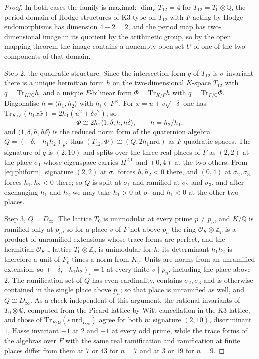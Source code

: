 \documentclass[11pt,reqno]{amsart}
\numberwithin{equation}{section}
\theoremstyle{plain}
\theoremstyle{definition}
\newcommand{\QQ}{\mathbb{Q}}
\newcommand{\ZZ}{\mathbb{Z}}
\begin{document}
\begin{proof}
In both cases the family is maximal: $\dim_{F}T_{12}=4$ for $T_{12}=T_{0}\otimes\QQ$, the period domain of Hodge structures of K3 type on $T_{12}$ with $F$ acting by Hodge endomorphisms has dimension $4-2=2$, and the period map has two-dimensional image in its quotient by the arithmetic group, so by the open mapping theorem the image contains a nonempty open set $U$ of one of the two components of that domain.

Step 2, the quadratic structure. Since the intersection form $q$ of $T_{12}$ is $\sigma$-invariant there is a unique hermitian form $h$ on the two-dimensional $K$-space $T_{12}$ with $q=\mathrm{Tr}_{K/\QQ}h$, and a unique $F$-bilinear form $\Phi=\mathrm{Tr}_{K/F}h$ with $q=\mathrm{Tr}_{F/\QQ}\Phi$. Diagonalise $h=\langle h_{1},h_{2}\rangle$ with $h_{i}\in F^{\times}$. For $x=u+v\sqrt{-\delta}$ one has $\mathrm{Tr}_{K/F}(h_{1}x\bar x)=2h_{1}(u^{2}+\delta v^{2})$, so
\begin{equation}\label{eq:phiform}
\Phi\cong2h_{1}\langle1,\delta,h,h\delta\rangle,\qquad h=h_{2}/h_{1},
\end{equation}
and $\langle1,\delta,h,h\delta\rangle$ is the reduced norm form of the quaternion algebra $Q=(-\delta,-h_{1}h_{2})_{F}$; thus $(T_{12},\Phi)\cong(Q,2h_{1}\mathrm{nrd})$ as $F$-quadratic spaces. The signature of $q$ is $(2,10)$ and splits over the three real places of $F$ as $(2,2)$ at the place $\sigma_{1}$ whose eigenspace carries $H^{2,0}$ and $(0,4)$ at the two others. From \eqref{eq:phiform}, signature $(2,2)$ at $\sigma_{1}$ forces $h_{1}h_{2}<0$ there, and $(0,4)$ at $\sigma_{2},\sigma_{3}$ forces $h_{1},h_{2}<0$ there; so $Q$ is split at $\sigma_{1}$ and ramified at $\sigma_{2}$ and $\sigma_{3}$, and after exchanging $h_{1}$ and $h_{2}$ we may take $h_{1}>0$ at $\sigma_{1}$ and $h_{1}<0$ at the other two places.

Step 3, $Q=D_{\infty}$. The lattice $T_{0}$ is unimodular at every prime $p\ne p_{n}$, and $K/\QQ$ is ramified only at $p_{n}$, so for a place $v$ of $F$ not above $p_{n}$ the ring $\mathcal{O}_{K}\otimes\ZZ_{p}$ is a product of unramified extensions whose trace forms are perfect, and the hermitian $\mathcal{O}_{K,v}$-lattice $T_{0}\otimes\ZZ_{p}$ is unimodular for $h$; its determinant $h_{1}h_{2}$ is therefore a unit of $F_{v}$ times a norm from $K_{v}$. Units are norms from an unramified extension, so $(-\delta,-h_{1}h_{2})_{v}=1$ at every finite $v\nmid p_{n}$, including the place above $2$. The ramification set of $Q$ has even cardinality, contains $\sigma_{2},\sigma_{3}$ and is otherwise contained in the single place above $p_{n}$; so that place is unramified as well, and $Q\cong D_{\infty}$. As a check independent of this argument, the rational invariants of $T_{0}\otimes\QQ$, computed from the Picard lattice by Witt cancellation in the K3 lattice, and those of $\mathrm{Tr}_{F/\QQ}(\varepsilon\,\mathrm{nrd}_{D_{\infty}})$ agree for both $n$: signature $(2,10)$, discriminant $1$, Hasse invariant $-1$ at $2$ and $+1$ at every odd prime, while the trace forms of the algebras over $F$ with the same real ramification and ramification at finite places differ from them at $7$ or $43$ for $n=7$ and at $3$ or $19$ for $n=9$.


\end{proof}
\end{document}
